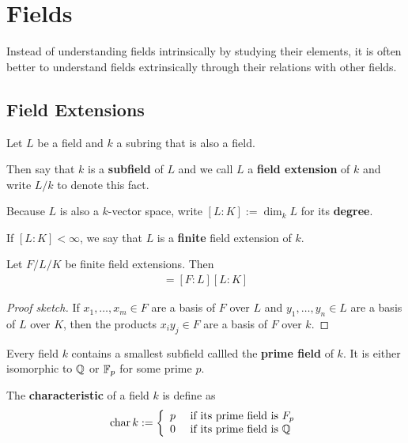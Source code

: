 \section{Fields}
Instead of understanding fields intrinsically by studying their elements, it is often better to understand fields extrinsically through their relations with other fields.

\subsection{Field Extensions}

\begin{dfn}[]
  Let $L$ be a field and $k$ a subring that is also a field.

  Then say that $k$ is a \textbf{subfield} of $L$ and we call $L$ a \textbf{field extension} of $k$ and write $L/k$ to denote this fact.

  Because $L$ is also a $k$-vector space, write $[L:K] := \dim_k L$ for its \textbf{degree}.

  If $[L:K] < \infty$, we say that $L$ is a \textbf{finite} field extension of $k$.

\end{dfn}


\begin{lem}
  Let $F/L/K$ be finite field extensions. Then
  \begin{align*}
    [F:K] = [F:L] [L:K]
  \end{align*}
\end{lem}
\begin{proof}[Proof sketch]
  If $x_{1}, \ldots, x_{m} \in F$ are a basis of $F$ over $L$ and $y_{1}, \ldots, y_{n} \in L$ are a basis of $L$ over $K$, then the products $x_iy_j \in F$ are a basis of $F$ over $k$.
\end{proof}

\begin{dfn}[]
  Every field $k$ contains a smallest subfield callled the \textbf{prime field} of $k$.
  It is either isomorphic to $\mathbb{Q}$ or $\mathbb{F}_p$ for some prime $p$.

  The \textbf{characteristic} of a field $k$ is define as
  \begin{align*}
    \operatorname{char} k := 
    \left\{\begin{array}{ll}
        p & \text{ if its prime field is } F_p\\
        0 & \text{ if its prime field is } \mathbb{Q}
    \end{array} \right.
  \end{align*}
\end{dfn}

